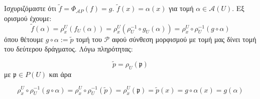 \noindent Ισχυριζόμαστε ότι $\tilde{f} = \Phi_{\mathcal{A}P}(f) = g$. $\tilde{f}(x) = \alpha(x)$ για τομή $\alpha \in \mathcal{A}(U)$. Εξ ορισμού έχουμε:
$$\tilde{f}(\alpha) = \rho^U_x(f_U(\alpha)) = \rho^U_x(\rho^{-1}_U\circ g_U(\alpha)) = \rho^U_x\circ \rho^{-1}_U(g \circ \alpha)$$ όπου θέτουμε $g\circ \alpha :=\tilde{p}$ τομή του $\mathcal{P}$ αφού σύνθεση μορφισμού με τομή μας δίνει τομή του δεύτερου δράγματος. Λόγω πληρότητας:

$$\tilde{p} = \rho_U(\mathfrak{p})$$ με $\mathfrak{p} \in P(U)$ και άρα

$$\rho^U_x\circ \rho^{-1}_U(g \circ \alpha) = \rho^U_x \circ \rho^{-1}_U (\tilde{p}) = \rho^U_x(\mathfrak{p}) = \tilde{p}(x) = g \circ \alpha(x) = g(\alpha)$$
